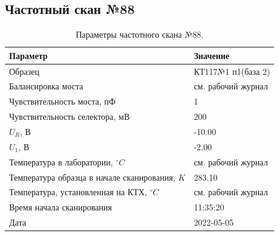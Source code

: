 \subsection{Частотный скан №88}
\begin{table}[!ht]
    \centering
    \caption{Параметры частотного скана №88.}
    \begin{tabular}{|l|l|}
        \hline
        Параметр                                       & Значение                  \\ \hline
        Образец                                        & КТ117№1 п1(база 2)        \\ \hline
        Балансировка моста                             & см. рабочий журнал        \\ \hline
        Чувствительность моста, пФ                     & 1                         \\ \hline
        Чувствительность селектора, мВ                 & 200                       \\ \hline
        $U_R$, В                                       & -10.00                    \\ \hline
        $U_1$, В                                       & -2.00                     \\ \hline
        Температура в лаборатории, $^\circ C$          & см. рабочий журнал        \\ \hline
        Температура образца в начале сканирования, $K$ & 283.10                    \\ \hline
        Температура, установленная на КТХ, $^\circ C$  & см. рабочий журнал        \\ \hline
        Время начала сканирования                      & 11:35:20                  \\ \hline
        Дата                                           & 2022-05-05                \\ \hline
    \end{tabular}
    \label{table:frequency_scan_88}
\end{table}

